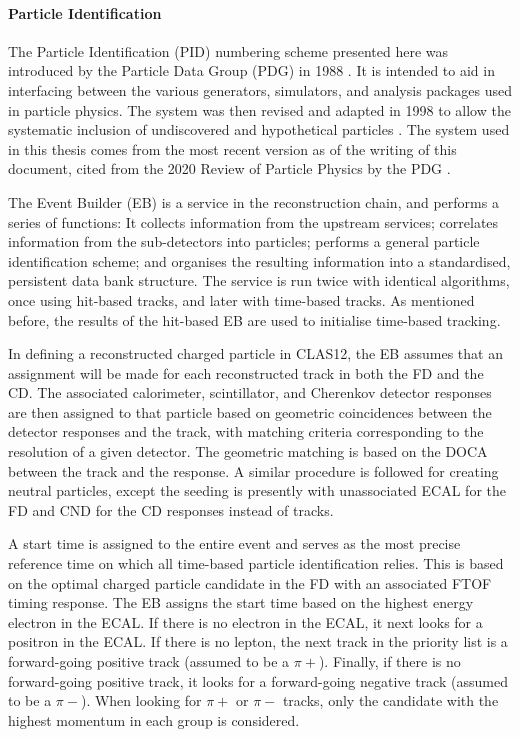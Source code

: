 \paragraph{Particle Identification}
    The Particle Identification (PID) numbering scheme presented here was introduced by the Particle Data Group (PDG) in 1988 \cite{yost1988}.
    It is intended to aid in interfacing between the various generators, simulators, and analysis packages used in particle physics.
    The system was then revised and adapted in 1998 to allow the systematic inclusion of undiscovered and hypothetical particles \cite{particle1998}.
    The system used in this thesis comes from the most recent version as of the writing of this document, cited from the 2020 Review of Particle Physics by the PDG \cite{particle2020review}.

    The Event Builder (EB) is a service in the reconstruction chain, and performs a series of functions:
    It collects information from the upstream services; correlates information from the sub-detectors into particles; performs a general particle identification scheme; and organises the resulting information into a standardised, persistent data bank structure.
    The service is run twice with identical algorithms, once using hit-based tracks, and later with time-based tracks.
    As mentioned before, the results of the hit-based EB are used to initialise time-based tracking.

    In defining a reconstructed charged particle in CLAS12, the EB assumes that an assignment will be made for each reconstructed track in both the FD and the CD.
    The associated calorimeter, scintillator, and Cherenkov detector responses are then assigned to that particle based on geometric coincidences between the detector responses and the track, with matching criteria corresponding to the resolution of a given detector.
    The geometric matching is based on the DOCA between the track and the response.
    A similar procedure is followed for creating neutral particles, except the seeding is presently with unassociated ECAL for the FD and CND for the CD responses instead of tracks.

    A start time is assigned to the entire event and serves as the most precise reference time on which all time-based particle identification relies.
    This is based on the optimal charged particle candidate in the FD with an associated FTOF timing response.
    The EB assigns the start time based on the highest energy electron in the ECAL.
    If there is no electron in the ECAL, it next looks for a positron in the ECAL.
    If there is no lepton, the next track in the priority list is a forward-going positive track (assumed to be a $\pi+$).
    Finally, if there is no forward-going positive track, it looks for a forward-going negative
    track (assumed to be a $\pi-$).
    When looking for $\pi+$ or $\pi-$ tracks, only the candidate with the highest momentum in each group is considered.

